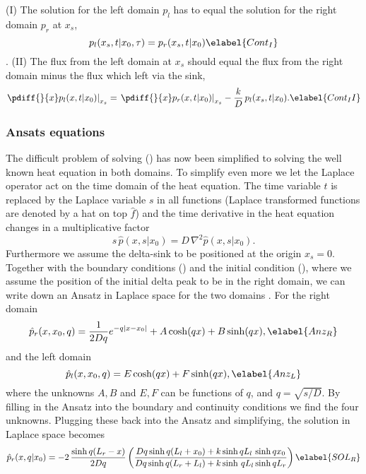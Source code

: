 (I) The solution for the left domain $p_l$ has to equal the solution for the right domain $p_r$ at $x_s$,
\begin{equation} 
 p_l(x_s,t|x_0,\tau) = p_r(x_s,t|x_0) 
 \elabel{Cont_I}
\end{equation}.
(II) The flux from the left domain at $x_s$ should equal the flux from the right domain minus the flux which left via the sink,
\begin{equation} 
 \left. \pdiff{}{x} p_l(x,t|x_0) \right|_{x_s} = \left. \pdiff{}{x} p_r(x,t|x_0) \right|_{x_s} - \frac{k}{D} \, p_{l}(x_s,t|x_0).
 \elabel{Cont_II}
\end{equation}

\subsubsection{Ansats equations}

The difficult problem of solving () has now been simplified to solving the well known heat equation in both domains. To simplify even more we let the Laplace operator act on the time domain of the heat equation. The time variable $t$ is replaced by the Laplace variable $s$ in all functions (Laplace transformed functions are denoted by a hat on top $\hat{f}$) and the time derivative in the heat equation changes in a multiplicative factor
\begin{equation}
 s \, \hat{p}(x,s|x_0) = D \, \nabla^2 \hat{p}(x,s|x_0).
\end{equation}
Furthermore we assume the delta-sink to be positioned at the origin $x_s=0$. Together with the boundary conditions () and the initial condition (), where we assume the position of the initial delta peak to be in the right domain, we can write down an Ansatz in Laplace space for the two domains \cite{Carslaw1959}. For the right domain
\begin{equation}
 \hat{p}_r(x,x_0,q) = \frac{1}{2 D q} e^{-q |x-x_0|} + A \, \mathrm{cosh} (q x) + B \, \mathrm{sinh} (q x),
 \elabel{Anz_R}
\end{equation}
and the left domain
\begin{equation}
 \hat{p}_l(x,x_0,q) = E \, \mathrm{cosh} (q x) + F \, \mathrm{sinh} (q x),
\elabel{Anz_L}
\end{equation}
where the unknowns $A,B$ and $E,F$ can be functions of $q$, and $q=\sqrt{s/D}$. By filling in the Ansatz into the boundary and continuity conditions we find the four unknowns. Plugging these back into the Ansatz and simplifying, the solution in Laplace space becomes
\begin{equation}
 \hat{p}_r(x,q|x_0) = -2 \, \frac{\mathrm{sinh} \, q(L_r - x)}{2 D q} \left( \frac{Dq \, \mathrm{sinh} \, q(L_l + x_0) + k \, \mathrm{sinh} \, q L_l \,\, \mathrm{sinh} \, q x_0}{Dq \, \mathrm{sinh} \, q(L_r + L_l) + k \, \mathrm{sinh} \,\, q L_l \, \mathrm{sinh} \, q L_r} \right)
 \elabel{SOL_R}
\end{equation}


